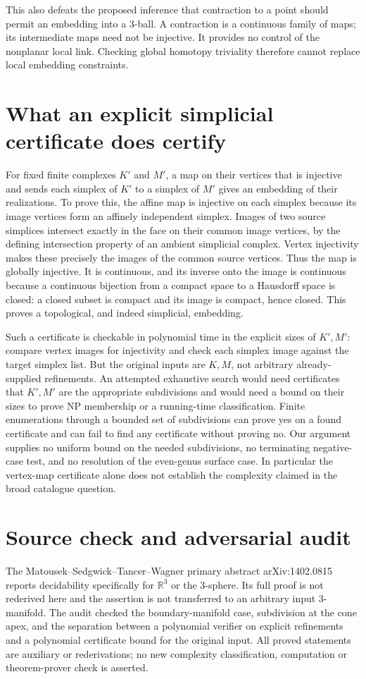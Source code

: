 \documentclass[11pt]{article}
\begin{document}
This also defeats the proposed inference that contraction to a point should
permit an embedding into a 3-ball. A contraction is a continuous family of
maps; its intermediate maps need not be injective. It provides no control
of the nonplanar local link. Checking global homotopy triviality therefore
cannot replace local embedding constraints.

\section{What an explicit simplicial certificate does certify}
For fixed finite complexes $K'$ and $M'$, a map on their vertices that is
injective and sends each simplex of $K'$ to a simplex of $M'$ gives an
embedding of their realizations. To prove this, the affine map is injective
on each simplex because its image vertices form an affinely independent
simplex. Images of two source simplices intersect exactly in the face on
their common image vertices, by the defining intersection property of an
ambient simplicial complex. Vertex injectivity makes these precisely the
images of the common source vertices. Thus the map is globally injective.
It is continuous, and its inverse onto the image is continuous because a
continuous bijection from a compact space to a Hausdorff space is closed:
a closed subset is compact and its image is compact, hence closed.
This proves a topological, and indeed simplicial, embedding.

Such a certificate is checkable in polynomial time in the explicit sizes
of $K',M'$: compare vertex images for injectivity and check each simplex
image against the target simplex list. But the original inputs are $K,M$,
not arbitrary already-supplied refinements. An attempted exhaustive search
would need certificates that $K',M'$ are the appropriate subdivisions and
would need a bound on their sizes to prove NP membership or a running-time
classification. Finite enumerations through a bounded set of subdivisions
can prove yes on a found certificate and can fail to find any certificate
without proving no. Our argument supplies no uniform bound on the needed
subdivisions, no terminating negative-case test, and no resolution of the
even-genus surface case. In particular the vertex-map certificate alone
does not establish the complexity claimed in the broad catalogue question.

\section{Source check and adversarial audit}
The Matousek--Sedgwick--Tancer--Wagner primary abstract arXiv:1402.0815
reports decidability specifically for $\mathbb R^3$ or the 3-sphere. Its full
proof is not rederived here and the assertion is not transferred to an
arbitrary input 3-manifold. The audit checked the boundary-manifold case,
subdivision at the cone apex, and the separation between a polynomial
verifier on explicit refinements and a polynomial certificate bound for the
original input. All proved statements are auxiliary or rederivations;
no new complexity classification, computation or theorem-prover check is
asserted.
\end{document}
